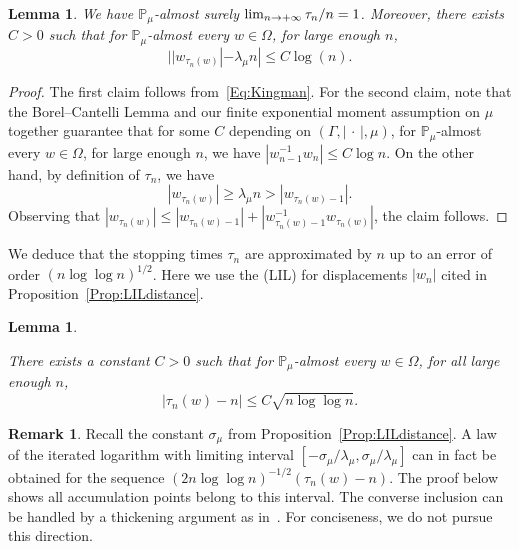 \documentclass[10pt]{amsart}
\newtheorem{lemm}[theo]{Lemma}\newtheorem{prop}[theo]{Proposition}\newtheorem{coro}[theo]{Corollary}\newtheorem{conj}[theo]{Conjecture}
\theoremstyle{definition}\newtheorem{defi}[theo]{Definition}\newtheorem{rema}[theo]{Remark}\newtheorem{exam}[theo]{Example}\newtheorem{exem}[theo]{Example}\newtheorem{nota}[theo]{Notation}
\renewcommand{\Pr}{\mathbb{P}}
\renewcommand{\(}{\left(}
\renewcommand{\)}{\right)}
\renewcommand*{\to}{\mathchoice{\longrightarrow}{\rightarrow}{\rightarrow}{\rightarrow}}
\begin{document}
\begin{lemm}\label{Lem:stopping_time-0}
We have $\Pr_{\mu}$-almost surely $\lim_{n\to +\infty }\tau_n /n= 1$. Moreover, there exists $C>0$ such that for $\Pr_{\mu}$-almost every $w\in \Omega$, for large enough $n$,
\[
| |w_{\tau_n(w)}|-\lambda_\mu n| \leq C\log(n).
\]
\end{lemm}

\begin{proof}
The first claim follows from~\eqref{Eq:Kingman}. For the second claim, note that the Borel--Cantelli Lemma and our finite exponential moment assumption on $\mu$ together guarantee that for some $C$ depending on $(\Gamma, |\,\cdot\,|, \mu)$, for $\Pr_{\mu}$-almost every $w\in \Omega$, for large enough $n$, we have $|w_{n-1}^{-1} w_n|\leq C \log n$. On the other hand, by definition of $\tau_n$, we have
\[
|w_{\tau_n(w)}|\ge \lambda_\mu n> |w_{\tau_n(w)-1}|.
\]
Observing that $|w_{\tau_n(w)}|\leq |w_{\tau_{n}(w)-1}|+ |w_{\tau_{n}(w)-1}^{-1} w_{\tau_{n}(w)}|$, the claim follows.
\end{proof}

We deduce that the stopping times $\tau_{n}$ are approximated by $n$ up to an error of order $(n\log\log n)^{1/2}$. Here we use the (LIL) for displacements $|w_{n}|$ cited in Proposition~\ref{Prop:LILdistance}.



\begin{lemm}\label{Lem:stopping_time}

There exists a constant $C> 0$ such that for $\Pr_{\mu}$-almost every $w\in \Omega$, for all large enough $n$,
\[
|\tau_n(w)-n|\le C\sqrt{n \log \log n}.
\]
\end{lemm}

\begin{rema}
Recall the constant $\sigma_{\mu}$ from Proposition~\ref{Prop:LILdistance}. A law of the iterated logarithm with limiting interval $[-\sigma_{\mu}/\lambda_{\mu}, \sigma_{\mu}/\lambda_{\mu}]$ can in fact be obtained for the sequence $(2n \log \log n)^{-1/2}(\tau_n(w)-n)$. The proof below shows all accumulation points belong to this interval. The converse inclusion can be handled by a thickening argument as in~\cite[Section~4.4]{BenardWinding}. For conciseness, we do not pursue this direction.
\end{rema}
\end{document}
